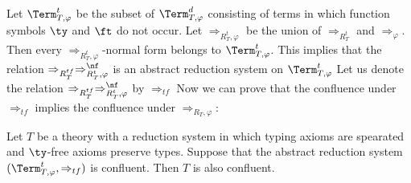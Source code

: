 Let $\Term_{T,\varphi}^t$ be the subset of $\Term_{T,\varphi}^d$ consisting of terms in which function symbols $\ty$ and $\ft$ do not occur.
Let $\Rightarrow_{R_T^t,\varphi}$ be the union of $\Rightarrow_{R^t_T}$ and $\Rightarrow_\varphi$.
Then every $\Rightarrow_{R_T^t,\varphi}$-normal form belongs to $\Term_{T,\varphi}^t$.
This implies that the relation $\Rightarrow_{R^{tf}_T} \Rightarrow_{R^t_T,\varphi}^\nf$ is an abstract reduction system on $\Term_{T,\varphi}^t$
Let us denote the relation $\Rightarrow_{R^{tf}_T} \Rightarrow_{R^t_T,\varphi}^\nf$ by $\Rightarrow_{tf}$
Now we can prove that the confluence under $\Rightarrow_{tf}$ implies the confluence under $\Rightarrow_{R_T,\varphi}$:

\begin{prop}[ty-elim]
Let $T$ be a theory with a reduction system in which typing axioms are spearated and $\ty$-free axioms preserve types.
Suppose that the abstract reduction system $(\Term_{T,\varphi}^t, \Rightarrow_{tf})$ is confluent.
Then $T$ is also confluent.
\end{prop}
